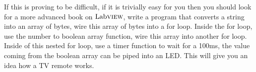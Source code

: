 \begin{enumerate}
	If this is proving to be difficult, if it is trivially easy for you then you should look for a more advanced book on $\text{Lab}\textsc{view}$, write a program that converts a string into an array of bytes, wire this array of bytes into a for loop. Inside the for loop, use the number to boolean array function, wire this array into another for loop. Inside of this nested for loop, use a timer function to wait for a 100ms, the value coming from the boolean array can be piped into an LED. This will give you an idea how a TV remote works.
\end{enumerate}
